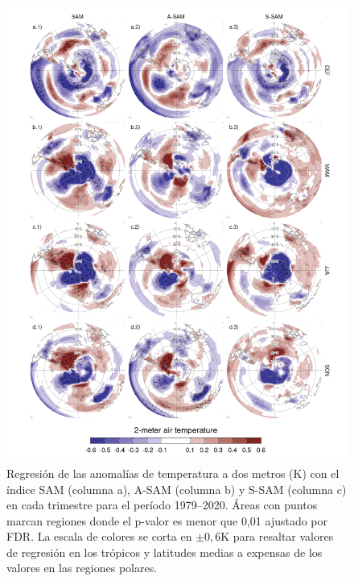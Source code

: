\documentclass[12pt,oneside,a4paper]{reedthesis}
\begin{document}
\begin{figure}

{\centering \includegraphics{figures/30-sam/regr-air-season-1} 

}

\caption{Regresión de las anomalías de temperatura a dos metros (K) con el índice SAM (columna a), A-SAM (columna b) y S-SAM (columna c) en cada trimestre para el período 1979--2020. Áreas con puntos marcan regiones donde el p-valor es menor que 0,01 ajustado por FDR. La escala de colores se corta en \(\pm0,6 \mathrm{K}\) para resaltar valores de regresión en los trópicos y latitudes medias a expensas de los valores en las regiones polares.}\label{fig:regr-air-season}
\end{figure}
\end{document}

